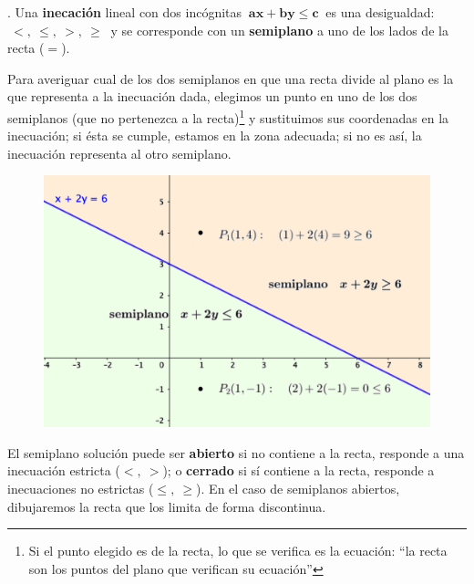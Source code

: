 \vspace{5mm}
\begin{theorem}
.	Una \textbf{inecación} lineal con dos incógnitas $ \ \boldsymbol{ax+by \le c} \ $ es una desigualdad: $\ <,\ \le, \ >,\ \ge\ $ y se corresponde con un \textbf{semiplano} a uno de los lados de la recta ($=$).

\vspace{5mm}
\begin{destacado}
	Para averiguar cual de los dos semiplanos en que una recta divide al plano es la que representa a la inecuación dada, elegimos un punto en uno de los dos semiplanos (que no pertenezca a la recta)\footnote{Si el punto elegido es de la recta, lo que se verifica es la ecuación: ``la recta son los puntos del plano que verifican su ecuación''} y sustituimos sus coordenadas en la inecuación; si ésta se cumple, estamos en la zona adecuada; si no es así, la inecuación representa al otro semiplano.
\end{destacado}
\end{theorem}

\begin{figure}[H]
	\centering
	\includegraphics[width=.9\textwidth]{imagenes/img06.png}
\end{figure}

\vspace{5mm}
El semiplano solución puede ser \textbf{abierto} si no contiene a la recta, responde a una inecuación estricta ($<,\ >$); o \textbf{cerrado} si sí contiene a la recta, responde a inecuaciones no estrictas ($\le,\ \ge$). En el caso de semiplanos abiertos, dibujaremos la recta que los limita de forma discontinua.

